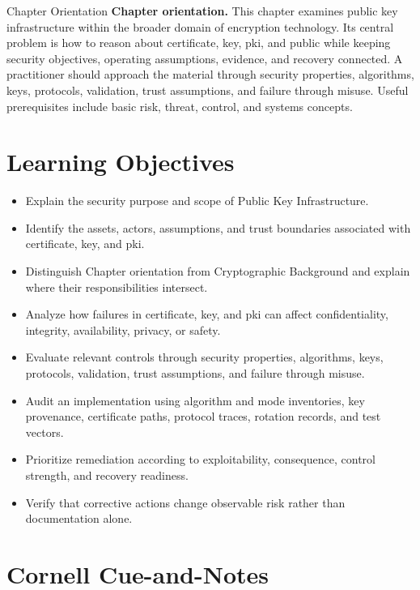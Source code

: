 \documentclass[11pt,letterpaper]{article}
\title{\CornellDocumentTitle}
\author{}
\date{}
\begin{document}
\maketitle
\begin{CornellOverviewBox}{Chapter Orientation}
\textbf{Chapter orientation.} This chapter examines public key infrastructure within the broader domain of encryption technology. Its central problem is how to reason about certificate, key, pki, and public while keeping security objectives, operating assumptions, evidence, and recovery connected. A practitioner should approach the material through security properties, algorithms, keys, protocols, validation, trust assumptions, and failure through misuse. Useful prerequisites include basic risk, threat, control, and systems concepts.
\end{CornellOverviewBox}
\section*{Learning Objectives}
\begin{itemize}
\item Explain the security purpose and scope of Public Key Infrastructure.
\item Identify the assets, actors, assumptions, and trust boundaries associated with certificate, key, and pki.
\item Distinguish Chapter orientation from Cryptographic Background and explain where their responsibilities intersect.
\item Analyze how failures in certificate, key, and pki can affect confidentiality, integrity, availability, privacy, or safety.
\item Evaluate relevant controls through security properties, algorithms, keys, protocols, validation, trust assumptions, and failure through misuse.
\item Audit an implementation using algorithm and mode inventories, key provenance, certificate paths, protocol traces, rotation records, and test vectors.
\item Prioritize remediation according to exploitability, consequence, control strength, and recovery readiness.
\item Verify that corrective actions change observable risk rather than documentation alone.
\end{itemize}
\section*{Cornell Cue-and-Notes}
\end{document}
